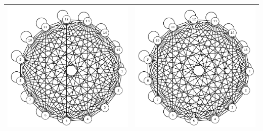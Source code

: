 \documentclass[a4paper,14pt]{extarticle}
\begin{document}
\begin{enumerate}[1.]
\begin{center}
\begin{longtable}{>{\centering\arraybackslash}p{}|>{\centering\arraybackslash}p{}}
				\includegraphics[width=70mm]{N15WOMaP225} & \includegraphics[width=70mm]{N15WMMaP225}\\
				\hline
			  \end{longtable}
	      \end{center}


\end{enumerate}
\end{document}
